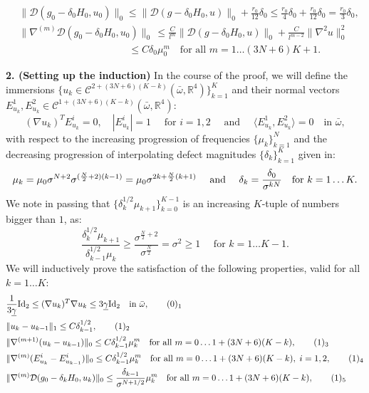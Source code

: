 \documentclass[reqno,twoside,11pt]{amsart}
\newcommand{\Id}{\mathrm{Id}}
\newcommand{\R}{\mathbb{R}}
\numberwithin{equation}{section}
\theoremstyle{plain}
\theoremstyle{definition}
\begin{document}
\begin{equation}\label{m9}
\begin{split}
& \|\mathcal{D}(g_0-\delta_0H_0,u_0)\|_0\leq \|\mathcal{D}(g-\delta_0H_0,u)\|_0
+\frac{r_0}{12}\delta_0\leq \frac{r_0}{4}\delta_0
+\frac{r_0}{12}\delta_0= \frac{r_0}{3}\delta_0,\\
& \|\nabla^{(m)}\mathcal{D}(g_0-\delta_0H_0,u_0)\|_0 \,\leq 
\frac{C}{l^m}\|\mathcal{D}(g-\delta_0H_0,u)\|_0 + \frac{C}{l^{m-2}}
\|\nabla^2u\|_0^2\\ & \qquad\qquad\qquad \qquad\qquad \quad
\leq C\delta_0 \mu_0^m\quad\mbox{for all } m=1\ldots (3N+6)K+1.
\end{split}
\end{equation}

\smallskip

{\bf 2. (Setting up the induction)} In the course of the proof, we will define the immersions
$\{u_k\in\mathcal{C}^{2+(3N+6)(K-k)}(\bar\omega,\R^4)\}_{k=1}^K$ and their
normal vectors $E_{u_k}^1, E_{u_k}^2\in \mathcal{C}^{1+(3N+6)(K-k)}
(\bar\omega,\R^4)$:
$$(\nabla u_k)^TE_{u_k}^i=0,\quad |E_{u_k}^i|=1 \quad \mbox{ for }
i=1,2 \quad\mbox{ and } \quad \langle E_{u_k}^1,E_{u_k}^2\rangle =
0\quad\mbox{in }\bar\omega,$$
with respect to the increasing progression of frequencies
$\{\mu_k\}_{k=1}^N$ and the decreasing progression of interpolating
defect magnitudes $\{\delta_k\}_{k=1}^K$ given in:
\begin{equation}\label{md_def}
\mu_k = \mu_0\sigma^{N+2}\sigma^{(\frac{N}{2}+2)(k-1)} =
\mu_0\sigma^{2k+ \frac{N}{2}(k+1)} \quad\mbox{ and } \quad \delta_{k}
= \frac{\delta_0}{\sigma^{kN}} \quad\mbox{for } k=1\ldots K.\\ 
\end{equation}
We note in passing that $\{\delta_k^{1/2}\mu_{k+1}\}_{k=0}^{K-1}$
is an increasing $K$-tuple of numbers bigger than $1$, as:
\begin{equation}\label{bas_incr}
\frac{\delta_k^{1/2}\mu_{k+1}}{\delta_{k-1}^{1/2}\mu_{k}} \geq 
\frac{\sigma^{\frac{N}{2}+2}}{\sigma^{\frac{N}{2}}} = 
\sigma^2\geq 1 \quad\mbox{ for } k=1\ldots K-1.
\end{equation}
We will inductively prove the satisfaction of the following properties, valid for all $k=1\ldots K$:
\begin{align*}
& \frac{1}{3\underline\gamma}\Id_2\leq (\nabla u_k)^T\nabla u_k\leq 3\underline\gamma\Id_2
\quad\mbox{in } \bar\omega, \tag*{(\theequation)$_1$}\refstepcounter{equation} \label{P1} \\
& \|u_k-u_{k-1}\|_1\leq C \delta_{k-1}^{1/2},
\tag*{(\theequation)$_2$} \label{P2} \\
& \|\nabla^{(m+1)}(u_k- u_{k-1})\|_0\leq C\delta_{k-1}^{1/2}
\mu_k^m\quad\mbox{for all } m=0\ldots 1+(3N+6)(K-k),
\tag*{(\theequation)$_3$} \label{P3} \\
& \|\nabla^{(m)}(E^i_{u_k}- E^i_{u_{k-1}})\|_0\leq
C\delta_{k-1}^{1/2} \mu_k^m\quad\mbox{for all } m=0\ldots 1+(3N+6)(K-k),\; i=1,2,
\tag*{(\theequation)$_4$} \label{P4} \\
& \|\nabla^{(m)}\mathcal{D}(g_0-\delta_kH_0,u_k)\|_0\leq \frac{\delta_{k-1}}{\sigma^{N+1/2}}\mu_k^m
\quad\mbox{for all } m=0\ldots 1+(3N+6)(K-k),
\tag*{(\theequation)$_5$} \label{P5}
\end{align*}
\end{document}
